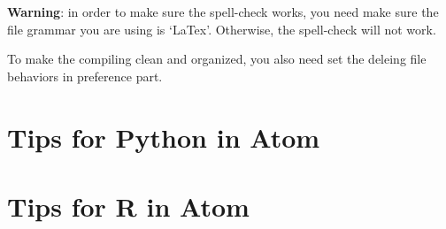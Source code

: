 \documentclass[12pt]{article}
\theoremstyle{definition}
\begin{document}
\textbf{Warning}: in order to make sure the spell-check works, you need make sure the file grammar you are using is `LaTex'. Otherwise, the spell-check will not work.

To make the compiling clean and organized, you also need set the deleing file behaviors in preference part. 

\section{Tips for Python in Atom}


\section{Tips for R in Atom }
\end{document}
